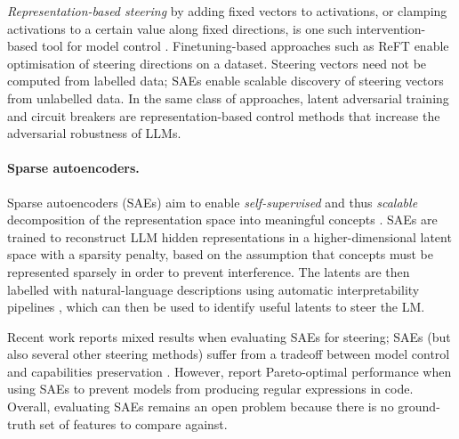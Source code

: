 \documentclass{article}
\theoremstyle{plain}
\theoremstyle{definition}
\theoremstyle{remark}
\renewcommand{\cite}{\citep}
\begin{document}
\textit{Representation-based steering} by adding fixed vectors to activations, or clamping activations to a certain value along fixed directions, is one such intervention-based tool for model control \citep{zou2023representationengineeringtopdownapproach,liInferenceTimeInterventionEliciting2024,turner2024steeringlanguagemodelsactivation,marks2024geometrytruthemergentlinear,liu2024incontext,vanderweij2024extendingactivationsteeringbroad,rimsky-etal-2024-steering}. Finetuning-based approaches such as ReFT \cite{wu2024reft} enable optimisation of steering directions on a dataset. Steering vectors need not be computed from labelled data; SAEs enable scalable discovery of steering vectors from unlabelled data.
In the same class of approaches, latent adversarial training \cite{casper2024defendingunforeseenfailuremodes} and circuit breakers \cite{zou2024improvingalignmentrobustnesscircuit} are representation-based control methods that increase the adversarial robustness of LLMs.


\paragraph{Sparse autoencoders.} Sparse autoencoders (SAEs) aim to enable \textit{self-supervised} and thus \textit{scalable} decomposition of the representation space into meaningful concepts \cite{templeton2024scaling,chalnev2024improvingsteeringvectorstargeting,makelov2024sparse,obrien2024steeringlanguagemodelrefusal,gao2024scalingevaluatingsparseautoencoders}. SAEs are trained to reconstruct LLM hidden representations in a higher-dimensional latent space with a sparsity penalty, based on the assumption that concepts must be represented sparsely in order to prevent interference. The latents are then labelled with natural-language descriptions using automatic interpretability pipelines \cite[e.g.][]{eleutherai}, which can then be used to identify useful latents to steer the LM.

Recent work reports mixed results when evaluating SAEs for steering; SAEs (but also several other steering methods) suffer from a tradeoff between model control and capabilities preservation \cite{mayne2024sparseautoencodersuseddecompose,chalnev2024improvingsteeringvectorstargeting,durmus2024steering,bhalla2025unifyinginterpretabilitycontrolevaluation}. However, \citet{karvonen2024sieve} report Pareto-optimal performance when using SAEs to prevent models from producing regular expressions in code. Overall, evaluating SAEs remains an open problem because there is no ground-truth set of features to compare against.
\end{document}
